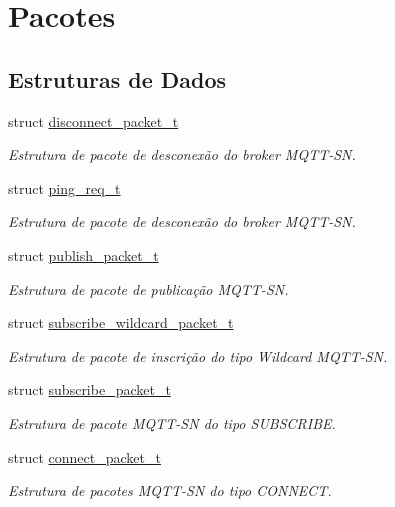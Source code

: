 \hypertarget{group__Pacotes}{\section{Pacotes}
\label{group__Pacotes}
}
\subsection*{Estruturas de Dados}
\begin{DoxyCompactItemize}
\item 
struct \hyperlink{structdisconnect__packet__t}{disconnect\+\_\+packet\+\_\+t}
\begin{DoxyCompactList}\small\item\em Estrutura de pacote de desconexão do broker M\+Q\+T\+T-\/\+S\+N. \end{DoxyCompactList}\item 
struct \hyperlink{structping__req__t}{ping\+\_\+req\+\_\+t}
\begin{DoxyCompactList}\small\item\em Estrutura de pacote de desconexão do broker M\+Q\+T\+T-\/\+S\+N. \end{DoxyCompactList}\item 
struct \hyperlink{structpublish__packet__t}{publish\+\_\+packet\+\_\+t}
\begin{DoxyCompactList}\small\item\em Estrutura de pacote de publicação M\+Q\+T\+T-\/\+S\+N. \end{DoxyCompactList}\item 
struct \hyperlink{structsubscribe__wildcard__packet__t}{subscribe\+\_\+wildcard\+\_\+packet\+\_\+t}
\begin{DoxyCompactList}\small\item\em Estrutura de pacote de inscrição do tipo Wildcard M\+Q\+T\+T-\/\+S\+N. \end{DoxyCompactList}\item 
struct \hyperlink{structsubscribe__packet__t}{subscribe\+\_\+packet\+\_\+t}
\begin{DoxyCompactList}\small\item\em Estrutura de pacote M\+Q\+T\+T-\/\+S\+N do tipo S\+U\+B\+S\+C\+R\+I\+B\+E. \end{DoxyCompactList}\item 
struct \hyperlink{structconnect__packet__t}{connect\+\_\+packet\+\_\+t}
\begin{DoxyCompactList}\small\item\em Estrutura de pacotes M\+Q\+T\+T-\/\+S\+N do tipo C\+O\+N\+N\+E\+C\+T. \end{DoxyCompactList}\item 

\end{DoxyCompactItemize}
